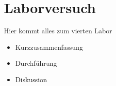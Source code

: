 \newpage

\section{Laborversuch}
Hier kommt alles zum vierten Labor

\begin{itemize}
    \item Kurzzusammenfassung
    \item Durchführung
    \item Diskussion
\end{itemize}


